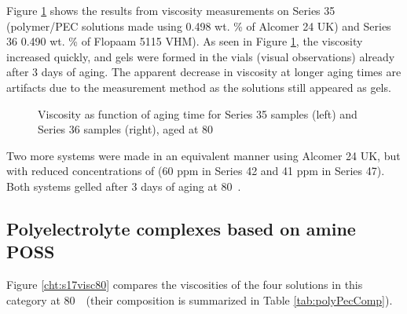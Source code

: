 Figure \ref{cht:s3536visc} shows the results from viscosity measurements on Series 35 (polymer/PEC solutions made using 0.498 wt. \% of Alcomer 24 UK) and Series 36  0.490 wt. \% of Flopaam 5115 VHM). As seen in Figure \ref{cht:s3536visc}, the viscosity increased quickly, and gels were formed in the vials (visual observations) already after 3 days of aging. The apparent decrease in viscosity at longer aging times are artifacts due to the measurement method as the solutions still appeared as gels.

\begin{figure}
    \centering
    \caption{Viscosity as function of aging time for Series 35 samples (left) and Series 36 samples (right), aged at 80~\celsius}
    \label{cht:s3536visc}
\end{figure}

Two more systems were made in an equivalent manner using Alcomer 24 UK, but with reduced concentrations of  (60 ppm in Series 42 and 41 ppm in Series 47). Both systems gelled after 3 days of aging at 80~\celsius.

\subsection{Polyelectrolyte complexes based on amine POSS}
Figure \ref{cht:s17visc80} compares the viscosities of the four solutions in this category at 80~\celsius~(their composition is summarized in Table \ref{tab:polyPecComp}).

